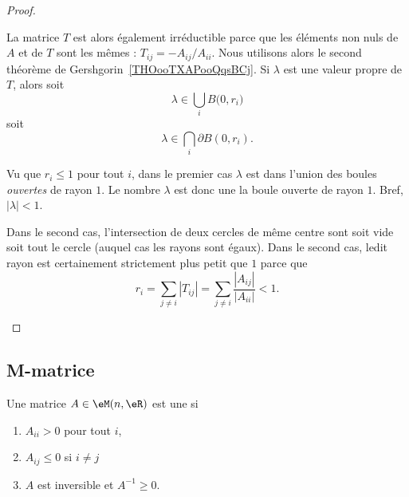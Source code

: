 \begin{proof}
\begin{subproof}

		La matrice \( T\) est alors également irréductible parce que les éléments non nuls de \( A\) et de \( T\) sont les mêmes : \( T_{ij}=-A_{ij}/A_{ii}\). Nous utilisons alors le second théorème de Gershgorin~\ref{THOooTXAPooQqsBCj}. Si \( \lambda\) est une valeur propre de \( T\), alors soit
		\begin{equation}
			\lambda\in\bigcup_iB\big( 0,r_i \big)
		\end{equation}
		soit
		\begin{equation}
			\lambda\in\bigcap_i\partial B(0,r_i).
		\end{equation}

		Vu que \( r_i\leq 1\) pour tout \( i\), dans le premier cas \( \lambda\) est dans l'union des boules \emph{ouvertes} de rayon \( 1\). Le nombre \( \lambda\) est donc une la boule ouverte de rayon \( 1\). Bref, \( | \lambda |<1\).

		Dans le second cas, l'intersection de deux cercles de même centre sont soit vide soit tout le cercle (auquel cas les rayons sont égaux). Dans le second cas, ledit rayon est certainement strictement plus petit que \( 1\) parce que
		\begin{equation}
			r_i=\sum_{j\neq i}| T_{ij} |=\sum_{j\neq i}\frac{ | A_{ij} | }{ | A_{ii} | }<1.
		\end{equation}
	\end{subproof}
\end{proof}

\subsection{M-matrice}

\begin{definition}      \label{DEFooZAWWooEAujPy}
	Une matrice \( A\in \eM(n,\eR)\) est une  si
	\begin{enumerate}
		\item
		      \( A_{ii}>0\) pour tout \( i\),
		\item
		      \( A_{ij}\leq 0\) si \( i\neq j\)
		\item
		      \( A\) est inversible et \( A^{-1}\geq 0\).
	\end{enumerate}
\end{definition}


